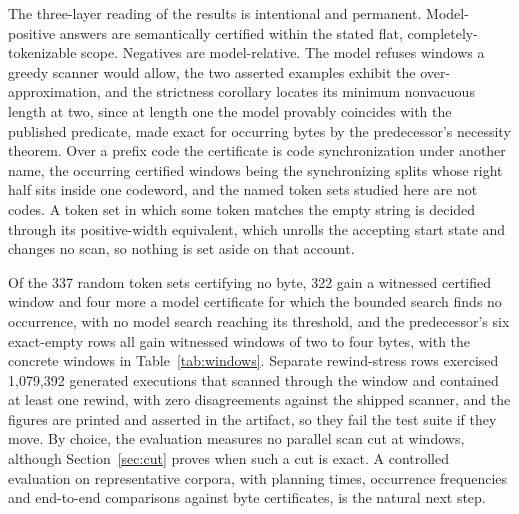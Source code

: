 \documentclass[11pt,a4paper]{article}
\theoremstyle{definition}
\theoremstyle{plain}
\begin{document}
The three-layer reading of the results is intentional and permanent. Model-positive answers are semantically certified
within the stated flat, completely-tokenizable scope. Negatives are model-relative. The model refuses windows a greedy
scanner would allow, the two asserted examples exhibit the over-approximation, and the strictness corollary locates its
minimum nonvacuous length at two, since at length one the model provably coincides with the published predicate, made
exact for occurring bytes by the predecessor's necessity theorem. Over a prefix code the certificate is code
synchronization under another name, the occurring certified windows being the synchronizing splits whose right half sits
inside one codeword, and the named token sets studied here are not codes. A token set in which some token matches the
empty string is decided through its positive-width equivalent, which unrolls the accepting start state and changes no
scan, so nothing is set aside on that account.

Of the 337 random token sets certifying no byte, 322 gain a witnessed certified window and four more a model certificate
for which the bounded search finds no occurrence, with no model search reaching its threshold, and the predecessor's six
exact-empty rows all gain witnessed windows of two to four bytes, with the concrete windows in Table~\ref{tab:windows}.
Separate rewind-stress rows exercised 1{,}079{,}392 generated executions that scanned through the window and contained
at least one rewind, with zero disagreements against the shipped scanner, and the figures are printed and asserted in
the artifact, so they fail the test suite if they move. By choice, the evaluation measures no parallel scan cut at
windows, although Section~\ref{sec:cut} proves when such a cut is exact. A controlled evaluation on representative
corpora, with planning times, occurrence frequencies and end-to-end comparisons against byte certificates, is the
natural next step.
\end{document}
